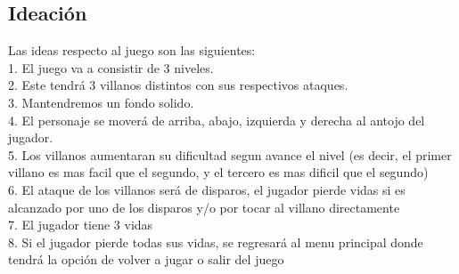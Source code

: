 \documentclass{article}
\begin{document}
\subsection{Ideación}
Las ideas respecto al juego son las siguientes:\\
1. El juego va a consistir de 3 niveles.\\
2. Este tendrá 3 villanos distintos con sus respectivos ataques.\\
3. Mantendremos un fondo solido.\\
4. El personaje se moverá de arriba, abajo, izquierda y derecha al antojo del jugador.\\
5. Los villanos aumentaran su dificultad segun avance el nivel (es decir, el primer villano es mas facil que el segundo, y el tercero es mas dificil que el segundo)\\
6. El ataque de los villanos será de disparos, el jugador pierde vidas si es alcanzado por uno de los disparos y/o por tocar al villano directamente\\
7. El jugador tiene 3 vidas\\
8. Si el jugador pierde todas sus vidas, se regresará al menu principal donde tendrá la opción de volver a jugar o salir del juego\\
\end{document}
